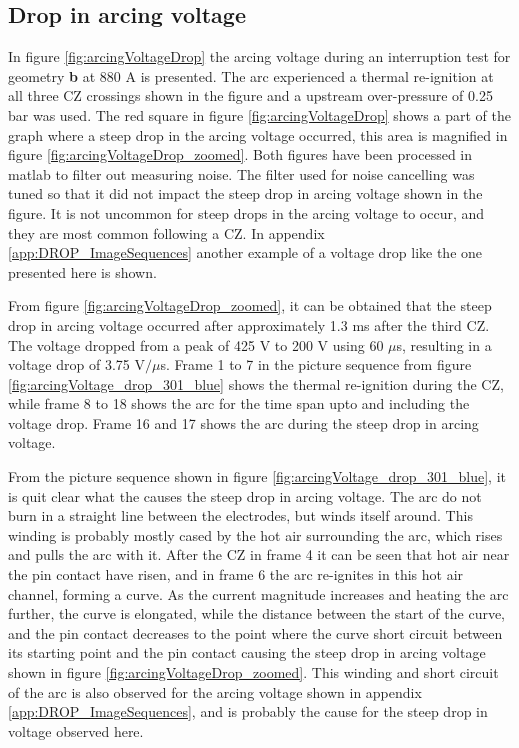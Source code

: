 \documentclass[10pt,b5paper,twoside]{article}
\begin{document}
\newpage
\subsection{Drop in arcing voltage} \label{sec:results_drop_arcing_voltage}

In figure \ref{fig:arcingVoltageDrop} the arcing voltage during an interruption test for geometry \textbf{b} at 880 A is presented. The arc experienced a thermal re-ignition at all three CZ crossings shown in the figure and a upstream over-pressure of 0.25 bar was used. The red square in figure \ref{fig:arcingVoltageDrop} shows a part of the graph where a steep drop in the arcing voltage occurred, this area is magnified in figure \ref{fig:arcingVoltageDrop_zoomed}. Both figures have been processed in matlab to filter out measuring noise. The filter used for noise cancelling was tuned so that it did not impact the steep drop in arcing voltage shown in the figure. It is not uncommon for steep drops in the arcing voltage to occur, and they are most common following a CZ. In appendix \ref{app:DROP_ImageSequences} another example of a voltage drop like the one presented here is shown. 

From figure \ref{fig:arcingVoltageDrop_zoomed}, it can be obtained that the steep drop in arcing voltage occurred after approximately 1.3 ms after the third CZ. The voltage dropped from a peak of 425 V to 200 V using 60 $\mu$s, resulting in a voltage drop of 3.75 V$/  \mu$s. Frame 1 to 7 in the picture sequence from figure \ref{fig:arcingVoltage_drop_301_blue} shows the thermal re-ignition during the CZ, while frame 8 to 18 shows the arc for the time span upto and including the voltage drop. Frame 16 and 17 shows the arc during the steep drop in arcing voltage. 

From the picture sequence shown in figure \ref{fig:arcingVoltage_drop_301_blue}, it is quit clear what the causes the steep drop in arcing voltage. The arc do not burn in a straight line between the electrodes, but winds itself around. This winding is probably mostly cased by the hot air surrounding the arc, which rises and pulls the arc with it. After the CZ in frame 4 it can be seen that hot air near the pin contact have risen, and in frame 6 the arc re-ignites in this hot air channel, forming a curve. As the current magnitude increases and heating the arc further, the curve is elongated, while the distance between the start of the curve, and the pin contact decreases to the point where the curve short circuit between its starting point and the pin contact causing the steep drop in arcing voltage shown in figure \ref{fig:arcingVoltageDrop_zoomed}. This winding and short circuit of the arc is also observed for the arcing voltage shown in appendix \ref{app:DROP_ImageSequences}, and is probably the cause for the steep drop in voltage observed here.
\end{document}
